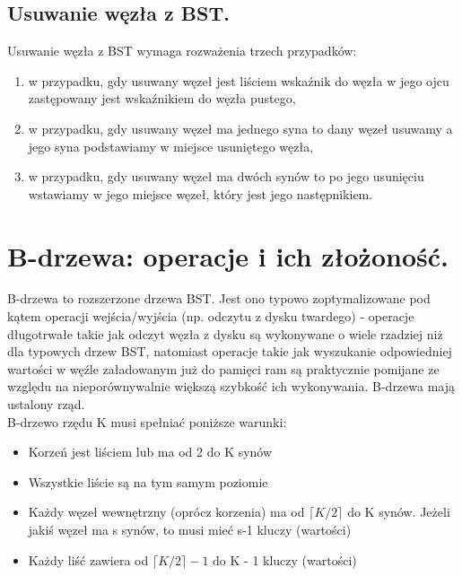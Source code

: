 \documentclass[12pt]{article}
\begin{document}
    \subsection{Usuwanie węzła z BST.}

    \begin{theorem}
        Usuwanie węzła z BST wymaga rozważenia trzech przypadków:
        \begin{enumerate}
            \item w przypadku, gdy usuwany węzeł jest liściem wskaźnik do węzła w jego ojcu zastępowany jest wskaźnikiem do węzła pustego,
            \item w przypadku, gdy usuwany węzeł ma jednego syna to dany węzeł usuwamy a jego syna podstawiamy w miejsce usuniętego węzła,
            \item w przypadku, gdy usuwany węzeł ma dwóch synów to po jego usunięciu wstawiamy w jego miejsce węzeł, który jest jego następnikiem.
        \end{enumerate}
    \end{theorem}

    \newpage

    \section{B-drzewa: operacje i ich złożoność.}
    B-drzewa to rozszerzone drzewa BST.
    Jest ono typowo zoptymalizowane pod kątem operacji wejścia/wyjścia (np. odczytu z dysku twardego) - operacje długotrwałe takie jak odczyt węzła z dysku są wykonywane o wiele rzadziej niż dla typowych drzew BST, natomiast operacje takie jak wyszukanie odpowiedniej wartości w węźle załadowanym już do pamięci ram są praktycznie pomijane ze względu na nieporównywalnie większą szybkość ich wykonywania.
    B-drzewa mają ustalony rząd. \\
    \noindent B-drzewo rzędu K musi spełniać poniższe warunki:
    \begin{itemize}
	    \item Korzeń jest liściem lub ma od 2 do K synów
	    \item Wszystkie liście są na tym samym poziomie
	    \item Każdy węzeł wewnętrzny (oprócz korzenia) ma od $\lceil K/2 \rceil$ do K synów. Jeżeli jakiś węzeł ma s synów, to musi mieć s-1 kluczy (wartości)
	    \item Każdy liść zawiera od $\lceil K/2 \rceil - 1$ do K - 1 kluczy (wartości)
    \end{itemize}
    
\end{document}
